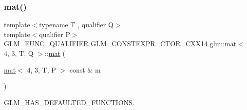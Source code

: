 \mbox{\label{structglm_1_1mat_3_014_00_013_00_01_t_00_01_q_01_4_a313800de73dd26da692bec90ff24ad42}} 
\subsubsection{\texorpdfstring{mat()}{mat()}\hspace{0.1cm}{\footnotesize\ttfamily [18/21]}}
{\footnotesize\ttfamily template$<$typename T , qualifier Q$>$ \\
template$<$qualifier P$>$ \\
\mbox{\hyperlink{setup_8hpp_a33fdea6f91c5f834105f7415e2a64407}{G\+L\+M\+\_\+\+F\+U\+N\+C\+\_\+\+Q\+U\+A\+L\+I\+F\+I\+ER}} \mbox{\hyperlink{setup_8hpp_a0900f9145e68bf6061b6f5e7be3fa751}{G\+L\+M\+\_\+\+C\+O\+N\+S\+T\+E\+X\+P\+R\+\_\+\+C\+T\+O\+R\+\_\+\+C\+X\+X14}} \mbox{\hyperlink{structglm_1_1mat}{glm\+::mat}}$<$ 4, 3, T, Q $>$\+::\mbox{\hyperlink{structglm_1_1mat}{mat}} (\begin{DoxyParamCaption}\item[{\mbox{\hyperlink{structglm_1_1mat}{mat}}$<$ 4, 3, T, P $>$ const \&}]{m }\end{DoxyParamCaption})}



G\+L\+M\+\_\+\+H\+A\+S\+\_\+\+D\+E\+F\+A\+U\+L\+T\+E\+D\+\_\+\+F\+U\+N\+C\+T\+I\+O\+NS. 

\mbox{\label{structglm_1_1mat_3_014_00_013_00_01_t_00_01_q_01_4_a97ef5af99c1162296ecfe810c2d8a4b1}} 

